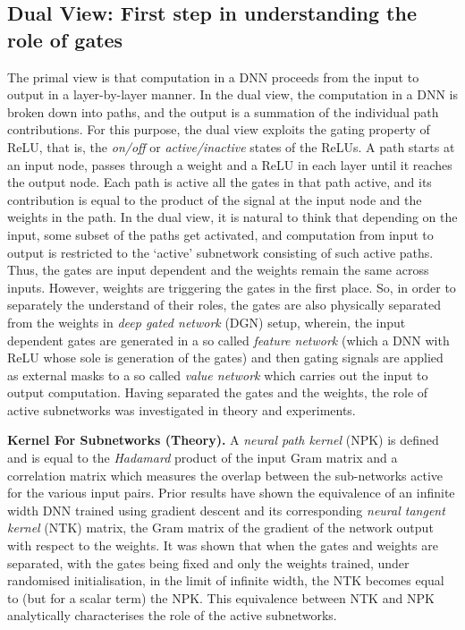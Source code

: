 \documentclass{article} %
\begin{document}
\subsection{Dual View: First step in understanding the role of gates}

The primal view is that computation in a DNN proceeds from the input to output in a layer-by-layer manner. In the dual view, the computation in a DNN is broken down into paths, and the output is a summation of the individual path contributions. For this purpose, the dual view exploits the gating property of ReLU, that is, the \emph{on/off} or \emph{active/inactive} states of the ReLUs. A path starts at an input node, passes through a weight and a ReLU in each layer until it reaches the output node. Each path is active all the gates in that path active, and its contribution is equal to the product of the signal at the input node and the weights in the path. In the dual view, it is natural to think that depending on the input, some subset of the paths get activated, and computation from input to output is restricted to the `active' subnetwork consisting of such active paths. Thus, the gates are input dependent and the weights remain the same across inputs. However, weights are triggering the gates in the first place. So, in order to separately the understand of their roles, the gates are also physically separated from the weights in \emph{deep gated network} (DGN) setup, wherein, the input dependent gates are generated in a so called \emph{feature network} (which a DNN with ReLU whose sole  is  generation of the gates) and then gating signals are applied as external masks to a so called \emph{value network} which carries out the input to output computation. Having separated the gates and the weights, the role of active subnetworks was investigated in theory and experiments.

\textbf{Kernel For Subnetworks (Theory).} A \emph{neural path kernel} (NPK) is defined and is equal to the \emph{Hadamard} product of the input Gram matrix and a correlation matrix which measures the overlap between the sub-networks active for the various input pairs. Prior results  \cite{arora2019exact,cao2019generalization,ntk} have shown the equivalence of an infinite width DNN trained using gradient descent and its corresponding \emph{neural tangent kernel} (NTK) matrix, the Gram matrix of the gradient of the network output with respect to the weights. It was shown that when the gates and weights are separated, with the gates being fixed and only the weights trained, under randomised initialisation, in the limit of infinite width, the NTK becomes equal to (but for a scalar term) the NPK. This equivalence between NTK and NPK analytically characterises the role of the active subnetworks.
\end{document}
